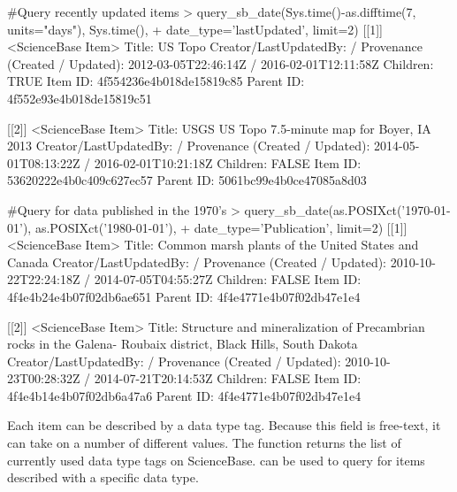 \begin{example}
#Query recently updated items
> query_sb_date(Sys.time()-as.difftime(7, units="days"), Sys.time(),
+    date_type='lastUpdated', limit=2)
[[1]]
<ScienceBase Item>
  Title: US Topo
  Creator/LastUpdatedBy:      /
  Provenance (Created / Updated):  2012-03-05T22:46:14Z / 2016-02-01T12:11:58Z
  Children: TRUE
  Item ID: 4f554236e4b018de15819c85
  Parent ID: 4f552e93e4b018de15819c51

[[2]]
<ScienceBase Item>
  Title: USGS US Topo 7.5-minute map for Boyer, IA 2013
  Creator/LastUpdatedBy:      /
  Provenance (Created / Updated):  2014-05-01T08:13:22Z / 2016-02-01T10:21:18Z
  Children: FALSE
  Item ID: 53620222e4b0c409c627ec57
  Parent ID: 5061bc99e4b0ce47085a8d03

#Query for data published in the 1970's
> query_sb_date(as.POSIXct('1970-01-01'), as.POSIXct('1980-01-01'),
+   date_type='Publication', limit=2)
[[1]]
<ScienceBase Item>
  Title: Common marsh plants of the United States and Canada
  Creator/LastUpdatedBy:      /
  Provenance (Created / Updated):  2010-10-22T22:24:18Z / 2014-07-05T04:55:27Z
  Children: FALSE
  Item ID: 4f4e4b24e4b07f02db6ae651
  Parent ID: 4f4e4771e4b07f02db47e1e4

[[2]]
<ScienceBase Item>
  Title: Structure and mineralization of Precambrian rocks in the Galena-
         Roubaix district, Black Hills, South Dakota
  Creator/LastUpdatedBy:      /
  Provenance (Created / Updated):  2010-10-23T00:28:32Z / 2014-07-21T20:14:53Z
  Children: FALSE
  Item ID: 4f4e4b14e4b07f02db6a47a6
  Parent ID: 4f4e4771e4b07f02db47e1e4

\end{example}

Each item can be described by a data type tag. Because this field is free-text,
it can take on a number of different values. The function 
returns the list of currently used data type tags on ScienceBase.
 can be used to query for items described with a
specific data type.

